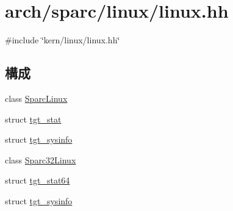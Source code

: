 \hypertarget{arch_2sparc_2linux_2linux_8hh}{
\section{arch/sparc/linux/linux.hh}
\label{arch_2sparc_2linux_2linux_8hh}
}
{\ttfamily \#include \char`\"{}kern/linux/linux.hh\char`\"{}}\par
\subsection*{構成}
\begin{DoxyCompactItemize}
\item 
class \hyperlink{classSparcLinux}{SparcLinux}
\item 
struct \hyperlink{structSparcLinux_1_1tgt__stat}{tgt\_\-stat}
\item 
struct \hyperlink{structSparcLinux_1_1tgt__sysinfo}{tgt\_\-sysinfo}
\item 
class \hyperlink{classSparc32Linux}{Sparc32Linux}
\item 
struct \hyperlink{structSparc32Linux_1_1tgt__stat64}{tgt\_\-stat64}
\item 
struct \hyperlink{structSparc32Linux_1_1tgt__sysinfo}{tgt\_\-sysinfo}
\end{DoxyCompactItemize}
